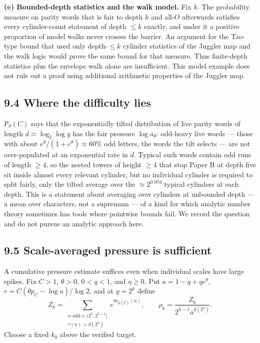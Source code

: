 \documentclass[11pt,a4paper]{article}
\begin{document}
\textbf{(e) Bounded-depth statistics and the walk model.} Fix \(k\). The
probability measure on parity words that is fair to depth \(k\) and
all-\(O\) afterwards satisfies every cylinder-count statement of depth
\(\le k\) exactly, and under it a positive proportion of model walks
never crosses the barrier. An argument for the Tao-type bound that used
only depth-\(\le k\) cylinder statistics of the Juggler map and the walk
logic would prove the same bound for that measure. Thus finite-depth
statistics plus the envelope walk alone are insufficient. This model
example does not rule out a proof using additional arithmetic properties
of the Juggler map.

\subsection{9.4 Where the difficulty
lies}\label{where-the-difficulty-lies}

\(\mathrm P_\theta(C)\) says that the exponentially tilted distribution
of live parity words of length \(d\asymp\log_2\log y\) has the fair
pressure \(\log a_\theta\): odd-heavy live words --- those with about
\(e^\theta/(1+e^\theta)\approx 60\%\) odd letters, the words the tilt
selects --- are not over-populated at an exponential rate in \(d\).
Typical such words contain odd runs of length \(\ge 4\), so the nested
towers of height \(\ge 4\) that stop Paper B at depth five sit inside
almost every relevant cylinder; but no individual cylinder is required
to split fairly, only the tilted average over the \(\approx 2^{0.97d}\)
typical cylinders at each depth. This is a statement about averaging
over cylinders at unbounded depth --- a mean over characters, not a
supremum --- of a kind for which analytic number theory sometimes has
tools where pointwise bounds fail. We record the question and do not
pursue an analytic approach here.

\subsection{9.5 Scale-averaged pressure is
sufficient}\label{scale-averaged-pressure-is-sufficient}

A cumulative pressure estimate suffices even when individual scales have
large spikes. Fix \(C>1\), \(\theta>0\), \(0<q<1\), and \(\eta\ge0\).
Put \(a=1-q+qe^\theta\), \(r=C(\theta p_C-\log a)/\log2\), and at
\(y=2^k\) define \[
Z_k=\sum_{\substack{n\text{ odd}\in(2^k,2^{k+1}]\\
                  \tau(n)>d(2^k)}}e^{\theta o_{d(2^k)}(n)},\qquad
\rho_k=\frac{Z_k}{2^{k-1}a^{d(2^k)}}.
\] Choose a fixed \(k_0\) above the verified target.
\end{document}
